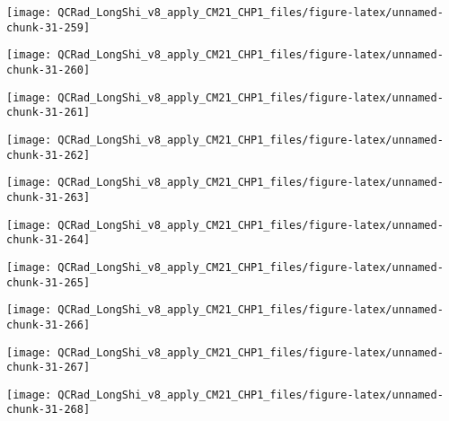 \documentclass[
  10pt,
  a4paper,oneside]{article}
\begin{document}
\begin{center}\texttt{[image: QCRad\_LongShi\_v8\_apply\_CM21\_CHP1\_files/figure-latex/unnamed-chunk-31-259]} \end{center}

\begin{center}\texttt{[image: QCRad\_LongShi\_v8\_apply\_CM21\_CHP1\_files/figure-latex/unnamed-chunk-31-260]} \end{center}

\begin{center}\texttt{[image: QCRad\_LongShi\_v8\_apply\_CM21\_CHP1\_files/figure-latex/unnamed-chunk-31-261]} \end{center}

\begin{center}\texttt{[image: QCRad\_LongShi\_v8\_apply\_CM21\_CHP1\_files/figure-latex/unnamed-chunk-31-262]} \end{center}

\begin{center}\texttt{[image: QCRad\_LongShi\_v8\_apply\_CM21\_CHP1\_files/figure-latex/unnamed-chunk-31-263]} \end{center}

\begin{center}\texttt{[image: QCRad\_LongShi\_v8\_apply\_CM21\_CHP1\_files/figure-latex/unnamed-chunk-31-264]} \end{center}

\begin{center}\texttt{[image: QCRad\_LongShi\_v8\_apply\_CM21\_CHP1\_files/figure-latex/unnamed-chunk-31-265]} \end{center}

\begin{center}\texttt{[image: QCRad\_LongShi\_v8\_apply\_CM21\_CHP1\_files/figure-latex/unnamed-chunk-31-266]} \end{center}

\begin{center}\texttt{[image: QCRad\_LongShi\_v8\_apply\_CM21\_CHP1\_files/figure-latex/unnamed-chunk-31-267]} \end{center}

\begin{center}\texttt{[image: QCRad\_LongShi\_v8\_apply\_CM21\_CHP1\_files/figure-latex/unnamed-chunk-31-268]} \end{center}
\end{document}
